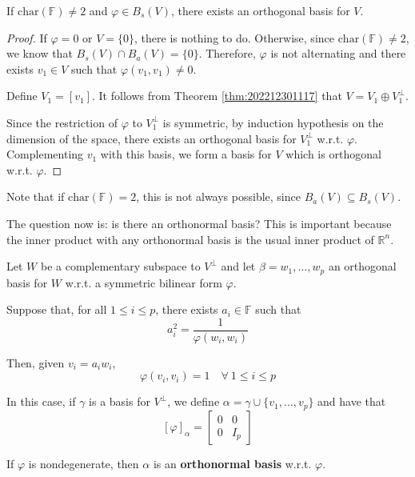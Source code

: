 \begin{theorem}
  If $\text{char}(\mathbb{F}) \neq 2$ and $\varphi \in B_s(V)$, there exists an orthogonal basis for $V$.
\end{theorem}

\begin{proof}
  If $\varphi = 0$ or $V = \{ 0 \}$, there is nothing to do. Otherwise, since $\text{char}(\mathbb{F}) \neq 2$, we know that $B_s(V) \cap B_a(V) = \{ 0 \}$. Therefore, $\varphi$ is not alternating and there exists $v_1 \in V$ such that $\varphi(v_1, v_1) \neq 0$.  

  Define $V_1 = [v_1]$. It follows from Theorem \ref{thm:202212301117} that $V = V_1 \oplus V_1^\perp$. 

  Since the restriction of $\varphi$ to $V_1^\perp$ is symmetric, by induction hypothesis on the dimension of the space, there exists an orthogonal basis for $V_1^\perp$ w.r.t. $\varphi$. Complementing $v_1$ with this basis, we form a basis for $V$ which is orthogonal w.r.t. $\varphi$. 
\end{proof}
  
Note that if $\text{char}(\mathbb{F}) = 2$, this is not always possible, since $B_a(V) \subseteq B_s(V)$. 

The question now is: is there an orthonormal basis? This is important because the inner product with any orthonormal basis is the usual inner product of $\mathbb{R}^n$. 

Let $W$ be a complementary subspace to $V^\perp$ and let $\beta = w_1, \ldots, w_p$ an orthogonal basis for $W$ w.r.t. a symmetric bilinear form $\varphi$. 

Suppose that, for all $1 \leq i \leq p$, there exists $a_i \in \mathbb{F}$ such that 
\[
  a_i^2 = \frac{1}{\varphi(w_i, w_i)}
\] 

Then, given $v_i = a_i w_i$, 
\[
  \varphi(v_i, v_i) = 1 \quad \forall~1 \leq i \leq p 
\]

In this case, if $\gamma$ is a basis for $V^\perp$, we define $\alpha = \gamma \cup \{ v_1, \ldots, v_p \}$ and have that 
\[
  [\varphi]_\alpha = \begin{bmatrix}
    0 & 0 \\
    0 & I_p 
  \end{bmatrix}
\]

\begin{definition}
If $\varphi$ is nondegenerate, then $\alpha$ is an \textbf{orthonormal basis} w.r.t. $\varphi$. 
\end{definition}

